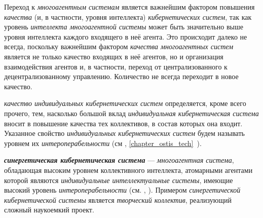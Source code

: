 {\label{sec_mas_overall_quality}} 

Переход к \textit{многоагентным системам} является важнейшим фактором повышения \textit{качества} (и, в частности, уровня интеллекта) \textit{кибернетических систем}, так как уровень \textit{интеллекта многоагентной системы} может быть значительно выше уровня интеллекта каждого входящего в неё агента. 
Это происходит далеко не всегда, поскольку важнейшим фактором \textit{качества многоагентных систем} является не только качество входящих в неё агентов, но и организация взаимодействия агентов и, в частности, переход от централизованного к децентрализованному управлению. 
Количество не всегда переходит в новое качество.

\textit{качество индивидуальных кибернетических систем} определяется, кроме всего прочего, тем, насколько большой вклад \textit{индивидуальная кибернетическая система} вносит в повышение качества тех коллективов, в состав которых она входит.
Указанное свойство \textit{индивидуальных кибернетических систем} будем называть уровнем их \textit{интероперабельности} (см , \ref{chapter_ostis_tech}~).

\textbf{\textit{синергетическая кибернетическая система}} --- \textit{многоагентная система}, обладающая высоким уровнем коллективного интеллекта, атомарными агентами которой являются \textit{индивидуальные интеллектуальные системы}, имеющие высокий уровень \textit{интероперабельности} (см. , ).
Примером \textit{синергетической кибернетической системы} является \textit{творческий коллектив}, реализующий сложный наукоемкий проект.

